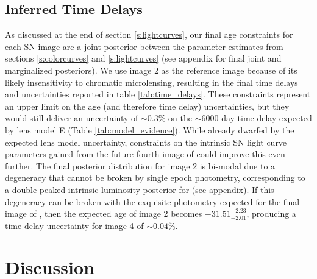 \documentclass[twocolumn]{aastex63}
\begin{document}
\subsection{Inferred Time Delays}
\label{s:timedelays}
As discussed at the end of section \ref{s:lightcurves}, our final age constraints for each SN image are a joint posterior between the parameter estimates from sections \ref{s:colorcurves} and \ref{s:lightcurves} (see appendix for final joint and marginalized posteriors). We use image 2 as the reference image because of its likely insensitivity to chromatic microlensing,  resulting in the final time delays and uncertainties reported in table \ref{tab:time_delays}. These constraints represent an upper limit on the age (and therefore time delay) uncertainties, but they would still deliver an uncertainty of $\sim0.3\%$ on the $\sim6000$ day time delay expected by lens model E (Table \ref{tab:model_evidence}). While already dwarfed by the expected lens model uncertainty, constraints on the intrinsic SN light curve parameters gained from the future fourth image of \SNABC could improve this even further. The final posterior distribution for image 2 is bi-modal due to a degeneracy that cannot be broken by single epoch photometry, corresponding to a double-peaked intrinsic luminosity posterior for \SNABC (see appendix). If this degeneracy can be broken with the exquisite photometry expected for the final image of \SNABC, then the expected age of image 2 becomes $-31.51^{+2.23}_{-2.01}$, producing a time delay uncertainty for image 4 of $\sim0.04\%$.


\section{Discussion}
\label{s:discussion}
\end{document}
